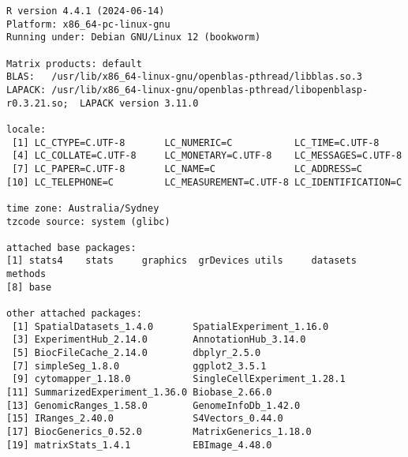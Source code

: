 \documentclass[
  letterpaper,
  DIV=11,
  numbers=noendperiod]{scrreprt}
\begin{document}
\begin{verbatim}
R version 4.4.1 (2024-06-14)
Platform: x86_64-pc-linux-gnu
Running under: Debian GNU/Linux 12 (bookworm)

Matrix products: default
BLAS:   /usr/lib/x86_64-linux-gnu/openblas-pthread/libblas.so.3 
LAPACK: /usr/lib/x86_64-linux-gnu/openblas-pthread/libopenblasp-r0.3.21.so;  LAPACK version 3.11.0

locale:
 [1] LC_CTYPE=C.UTF-8       LC_NUMERIC=C           LC_TIME=C.UTF-8       
 [4] LC_COLLATE=C.UTF-8     LC_MONETARY=C.UTF-8    LC_MESSAGES=C.UTF-8   
 [7] LC_PAPER=C.UTF-8       LC_NAME=C              LC_ADDRESS=C          
[10] LC_TELEPHONE=C         LC_MEASUREMENT=C.UTF-8 LC_IDENTIFICATION=C   

time zone: Australia/Sydney
tzcode source: system (glibc)

attached base packages:
[1] stats4    stats     graphics  grDevices utils     datasets  methods  
[8] base     

other attached packages:
 [1] SpatialDatasets_1.4.0       SpatialExperiment_1.16.0   
 [3] ExperimentHub_2.14.0        AnnotationHub_3.14.0       
 [5] BiocFileCache_2.14.0        dbplyr_2.5.0               
 [7] simpleSeg_1.8.0             ggplot2_3.5.1              
 [9] cytomapper_1.18.0           SingleCellExperiment_1.28.1
[11] SummarizedExperiment_1.36.0 Biobase_2.66.0             
[13] GenomicRanges_1.58.0        GenomeInfoDb_1.42.0        
[15] IRanges_2.40.0              S4Vectors_0.44.0           
[17] BiocGenerics_0.52.0         MatrixGenerics_1.18.0      
[19] matrixStats_1.4.1           EBImage_4.48.0             


\end{verbatim}
\end{document}
